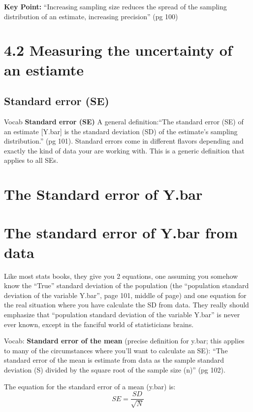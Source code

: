 \documentclass[]{book}
\theoremstyle{definition}
\theoremstyle{definition}
\theoremstyle{definition}
\theoremstyle{remark}
\begin{document}
\textbf{Key Point:} ``Increasing sampling size reduces the spread of the
sampling distribution of an estimate, increasing precision'' (pg 100)

\section{4.2 Measuring the uncertainty of an
estiamte}\label{measuring-the-uncertainty-of-an-estiamte}

\subsection{Standard error (SE)}\label{standard-error-se}

Vocab \textbf{Standard error (SE)} A general definition:``The standard
error (SE) of an estimate {[}Y.bar{]} is the standard deviation (SD) of
the estimate's sampling distribution.'' (pg 101). Standard errors come
in different flavors depending and exactly the kind of data your are
working with. This is a generic definition that applies to all SEs.

\section{The Standard error of Y.bar}\label{the-standard-error-of-y.bar}

\section{The standard error of Y.bar from
data}\label{the-standard-error-of-y.bar-from-data}

Like most stats books, they give you 2 equations, one assuming you
somehow know the ``True'' standard deviation of the population (the
``population standard deviation of the variable Y.bar'', page 101,
middle of page) and one equation for the real situation where you have
calculate the SD from data. They really should emphasize that
``population standard deviation of the variable Y.bar'' is never ever
known, except in the fanciful world of statisticians brains.

Vocab: \textbf{Standard error of the mean} (precise definition for
y.bar; this applies to many of the circumstances where you'll want to
calculate an SE): ``The standard error of the mean is estimate from data
as the sample standard deviation (S) divided by the square root of the
sample size (n)'' (pg 102).

The equation for the standard error of a mean (y.bar) is:
\[SE = \frac{SD}{\sqrt{N}}\]
\end{document}
